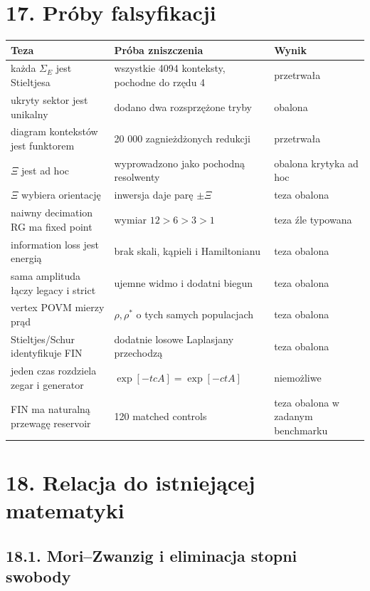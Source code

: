 \documentclass[11pt,a4paper,openany]{report}
\begin{document}
\chapter{17. Próby falsyfikacji}

\begin{center}
\begingroup\small
\setlength{\tabcolsep}{2.5pt}
\renewcommand{\arraystretch}{1.16}
\begin{longtable}{@{}p{}p{}p{}@{}}
\toprule
\textbf{Teza} & \textbf{Próba zniszczenia} & \textbf{Wynik} \\
\midrule
\endhead
ka\.zda \(\Sigma_E\) jest Stieltjesa & wszystkie 4094 konteksty, pochodne do rzędu 4 & przetrwała \\
ukryty sektor jest unikalny & dodano dwa rozsprzę\.zone tryby & obalona \\
diagram kontekstów jest funktorem & 20 000 zagnie\.zd\.zonych redukcji & przetrwała \\
\(\Xi\) jest ad hoc & wyprowadzono jako pochodną resolwenty & obalona krytyka ad hoc \\
\(\Xi\) wybiera orientację & inwersja daje parę \(\pm\Xi\) & teza obalona \\
naiwny decimation RG ma fixed point & wymiar \(12>6>3>1\) & teza źle typowana \\
information loss jest energią & brak skali, kąpieli i Hamiltonianu & teza obalona \\
sama amplituda łączy legacy i strict & ujemne widmo i dodatni biegun & teza obalona \\
vertex POVM mierzy prąd & \(\rho,\rho^\ast\) o tych samych populacjach & teza obalona \\
Stieltjes/\allowbreak{}Schur identyfikuje FIN & dodatnie losowe Laplasjany przechodzą & teza obalona \\
jeden czas rozdziela zegar i generator & \(\exp[-tcA]=\exp[-ctA]\) & niemo\.zliwe \\
FIN ma naturalną przewagę reservoir & 120 matched controls & teza obalona w zadanym benchmarku \\
\bottomrule
\end{longtable}
\endgroup
\end{center}

\chapter{18. Relacja do istniejącej matematyki}

\section{18.1. Mori--Zwanzig i eliminacja stopni swobody}
\end{document}
